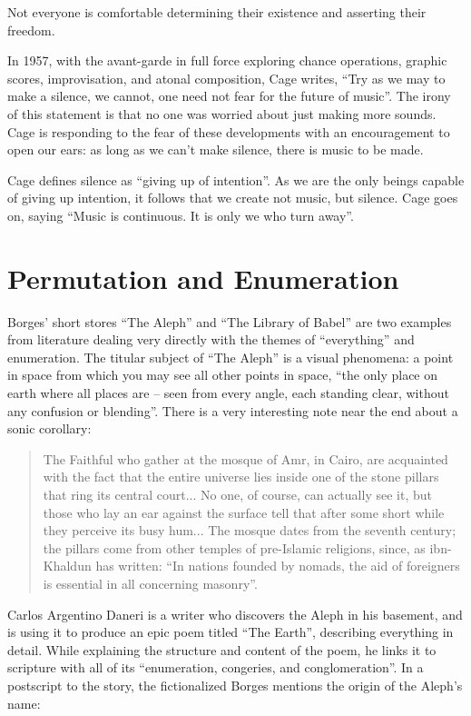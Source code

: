 \documentclass{thesis}
\begin{document}
	Not everyone is comfortable determining their existence and asserting their freedom.
	
	In 1957, with the avant-garde in full force exploring chance operations, graphic scores, improvisation, and atonal composition, Cage writes, ``Try as we may to make a silence, we cannot, one need not fear for the future of music''. The irony of this statement is that no one was worried about just making more sounds. Cage is responding to the fear of these developments with an encouragement to open our ears: as long as we can't make silence, there is music to be made.
	
	Cage defines silence as ``giving up of intention''. As we are the only beings capable of giving up intention, it follows that we create not music, but silence. Cage goes on, saying ``Music is continuous. It is only we who turn away''.
			
\section{Permutation and Enumeration}
	Borges' short stores ``The Aleph''\cite{borges_aleph_2004} and ``The Library of Babel''\cite{borges_library_2000} are two examples from literature dealing very directly with the themes of ``everything'' and enumeration. The titular subject of ``The Aleph'' is a visual phenomena: a point in space from which you may see all other points in space, ``the only place on earth where all places are -- seen from every angle, each standing clear, without any confusion or blending''. There is a very interesting note near the end about a sonic corollary:
	
	\begin{quote}
	The Faithful who gather at the mosque of Amr, in Cairo, are acquainted with the fact that the entire universe lies inside one of the stone pillars that ring its central court... No one, of course, can actually see it, but those who lay an ear against the surface tell that after some short while they perceive its busy hum... The mosque dates from the seventh century; the pillars come from other temples of pre-Islamic religions, since, as ibn-Khaldun has written: ``In nations founded by nomads, the aid of foreigners is essential in all concerning masonry''.
	\end{quote}
	
	Carlos Argentino Daneri is a writer who discovers the Aleph in his basement, and is using it to produce an epic poem titled ``The Earth'', describing everything in detail. While explaining the structure and content of the poem, he links it to scripture with all of its ``enumeration, congeries, and conglomeration''. In a postscript to the story, the fictionalized Borges mentions the origin of the Aleph's name:
	
\end{document}
